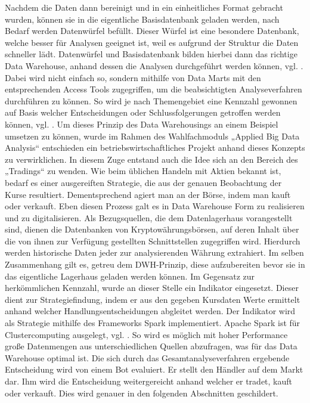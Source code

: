 Nachdem die Daten dann bereinigt und in ein einheitliches Format gebracht wurden, können sie in die eigentliche Basisdatenbank geladen werden, nach Bedarf werden  Datenwürfel befüllt. Dieser Würfel ist eine besondere Datenbank, welche besser für Analysen geeignet ist, weil es aufgrund der Struktur die Daten schneller lädt. Datenwürfel und Basisdatenbank bilden hierbei dann das richtige Data Warehouse, anhand dessen die Analysen durchgeführt werden können, vgl. \cite{vorlesung}. Dabei wird nicht einfach so, sondern mithilfe von Data Marts mit den entsprechenden Access Tools zugegriffen, um die beabsichtigten Analyseverfahren durchführen zu können. So wird je nach Themengebiet eine Kennzahl gewonnen auf Basis welcher Entscheidungen oder Schlussfolgerungen getroffen werden können, vgl. \cite{dtw}.
Um dieses Prinzip des Data Warehousings an einem Beispiel umsetzen zu können, wurde im Rahmen des Wahlfachmoduls „Applied Big Data Analysis“ entschieden ein betriebswirtschaftliches Projekt anhand dieses Konzepts zu verwirklichen. In diesem Zuge entstand auch die Idee sich an den Bereich des „Tradings“ zu wenden. Wie beim üblichen Handeln mit Aktien bekannt ist, bedarf es einer ausgereiften Strategie, die aus der genauen Beobachtung der Kurse resultiert. Dementsprechend agiert man an der Börse, indem man kauft oder verkauft. Eben diesen Prozess galt es in Data Warehouse Form zu realisieren und zu digitalisieren. Als Bezugsquellen, die dem Datenlagerhaus vorangestellt sind, dienen die Datenbanken von Kryptowährungsbörsen, auf deren Inhalt über die von ihnen zur Verfügung gestellten Schnittstellen zugegriffen wird. Hierdurch werden historische Daten jeder zur analysierenden Währung extrahiert. Im selben Zusammenhang gilt es, getreu dem DWH-Prinzip, diese aufzubereiten bevor sie in das eigentliche Lagerhaus geladen werden können. Im Gegensatz zur herkömmlichen Kennzahl, wurde an dieser Stelle ein Indikator eingesetzt. Dieser dient zur Strategiefindung, indem er aus den gegeben Kursdaten Werte ermittelt anhand welcher Handlungsentscheidungen abgleitet werden. Der Indikator wird als Strategie mithilfe des Frameworks Spark implementiert. 
Apache Spark ist für Clustercomputing ausgelegt, vgl. \cite{spark}. So wird es möglich mit hoher Performance große Datenmengen aus unterschiedlichen Quellen abzufragen, was für das Data Warehouse optimal ist. Die sich durch das Gesamtanalyseverfahren ergebende Entscheidung wird von einem Bot evaluiert. Er stellt den Händler auf dem Markt dar. Ihm wird die Entscheidung weitergereicht anhand welcher er tradet, kauft oder verkauft. Dies wird genauer in den folgenden Abschnitten geschildert.
